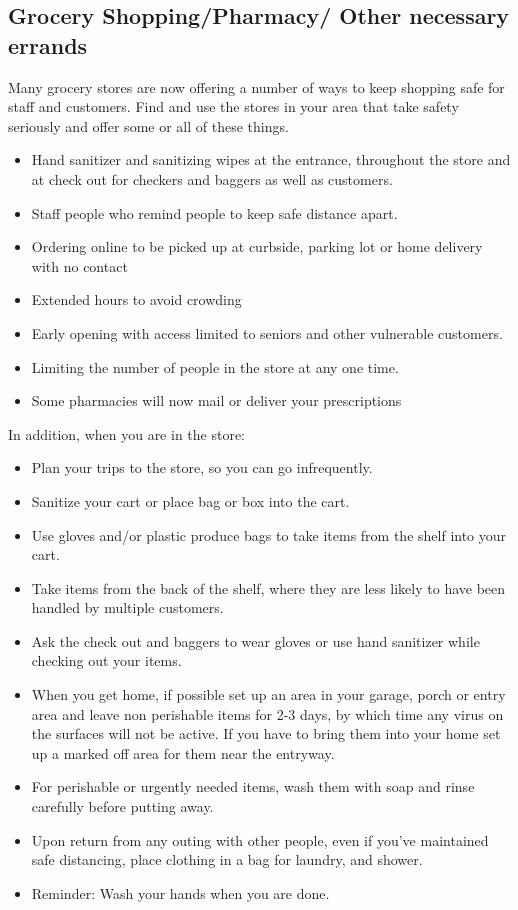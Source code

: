 \documentclass[onecolumn,journal]{IEEEtran}
\begin{document}
\begin{multicols}{2}
\section*{Grocery Shopping/Pharmacy/ Other necessary errands}
Many grocery stores are now offering a number of ways to keep shopping safe for staff and customers. Find and use the stores in your area that take safety seriously and offer some or all of these things.

\begin{itemize}
    \item Hand sanitizer and sanitizing wipes at the entrance, throughout the store and at check out for checkers and baggers as well as customers.
    \item Staff people who remind people to keep safe distance apart. 
    \item Ordering online to be picked up at curbside, parking lot or home delivery with no contact
    \item Extended hours to avoid crowding
    \item Early opening with access limited to seniors and other vulnerable customers.
    \item Limiting the number of people in the store at any one time.
    \item Some pharmacies will now mail or deliver your prescriptions 
\end{itemize}
In addition, when you are in the store:
\begin{itemize}
    \item Plan your trips to the store, so you can go infrequently. 
    \item Sanitize your cart or place bag or box into the cart.
    \item Use gloves and/or plastic produce bags to take items from the shelf into your cart. 
    \item Take items from the back of the shelf, where they are less likely to have been handled by multiple customers. 
    \item Ask the check out and baggers to wear gloves or use hand sanitizer while checking out your items.
    \item When you get home, if possible set up an area in your garage, porch or entry area and leave non perishable items for 2-3 days, by which time any virus on the surfaces will not be active. If you have to bring them into your home set up a marked off area for them near the entryway.
    \item For perishable or urgently needed items, wash them with soap and rinse carefully before putting away. 
    \item Upon return from any outing with other people, even if you’ve maintained safe distancing, place clothing in a bag for laundry, and shower.
    \item Reminder: Wash your hands when you are done. 


\end{itemize}
\end{multicols}
\end{document}

